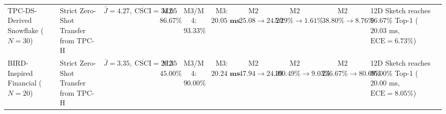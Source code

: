 \documentclass[10pt,a4paper]{article}
\newenvironment{fitasttable}{%
  \begin{lrbox}{\asttblbox}%
}{%
  \end{lrbox}%
  \sbox{\asttblboxB}{%
    \ifdim\wd\asttblbox>0.96\textwidth
      \resizebox{0.96\textwidth}{!}{\usebox{\asttblbox}}%
    \else
      \usebox{\asttblbox}%
    \fi
  }%
  \ifdim\ht\asttblboxB>0.78\textheight
    \resizebox{!}{0.78\textheight}{\usebox{\asttblboxB}}%
  \else
    \usebox{\asttblboxB}%
  \fi
}
\begin{document}
\begin{table}[!htbp]
\begin{fitasttable}
\begin{tabular}{@{}llcccccccl@{}}
TPC-DS-Derived Snowflake ($N=30$) & Strict Zero-Shot Transfer from TPC-H & $\bar{J}=4.27,\ \overline{\text{CSCI}}=31.05$ & M2: $86.67\%$ & M3/M4: $\mathbf{93.33\%}$ & M3: $\mathbf{20.05\text{ ms}}$ & M2 $25.08\rightarrow \mathbf{24.20}$ & M2 $5.29\%\rightarrow \mathbf{1.61\%}$ & M2 $38.80\%\rightarrow \mathbf{8.76\%}$ & 12D Sketch reaches $\mathbf{96.67\%}$ Top-1 ($20.03\text{ ms}$, $\text{ECE}=6.73\%$) \\
BIRD-Inspired Financial ($N=20$) & Strict Zero-Shot Transfer from TPC-H & $\bar{J}=3.35,\ \overline{\text{CSCI}}=29.35$ & M2: $45.00\%$ & M3/M4: $\mathbf{90.00\%}$ & M3: $\mathbf{20.24\text{ ms}}$ & M2 $47.94\rightarrow \mathbf{24.39}$ & M2 $100.49\%\rightarrow \mathbf{9.03\%}$ & M2 $236.67\%\rightarrow \mathbf{80.69\%}$ & 12D Sketch reaches $\mathbf{95.00\%}$ Top-1 ($20.00\text{ ms}$, $\text{ECE}=8.05\%$) \\
\bottomrule
\end{tabular}
\end{fitasttable}%
\end{table}
\end{document}
